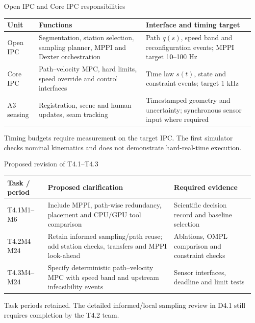 \documentclass[aspectratio=169,10pt]{beamer}
\begin{document}
\begin{frame}{Open IPC and Core IPC responsibilities}
\small\renewcommand{\arraystretch}{1.3}
\begin{tabularx}{\textwidth}{@{}p{}XX@{}}
\toprule
Unit & Functions & Interface and timing target\\\midrule
Open IPC & Segmentation, station selection, sampling planner, MPPI and Dexter orchestration & Path $q(s)$, speed band and reconfiguration events; MPPI target 10--100 Hz\\
Core IPC & Path--velocity MPC, hard limits, speed override and control interfaces & Time law $s(t)$, state and constraint events; target 1 kHz\\
A3 sensing & Registration, scene and human updates, seam tracking & Timestamped geometry and uncertainty; synchronous sensor input where required\\\bottomrule
\end{tabularx}\par\medskip
Timing budgets require measurement on the target IPC. The first simulator checks nominal kinematics and does not demonstrate hard-real-time execution.
\end{frame}

\begin{frame}{Proposed revision of T4.1--T4.3}
\small\renewcommand{\arraystretch}{1.3}
\begin{tabularx}{\textwidth}{@{}p{}XX@{}}
\toprule
Task / period & Proposed clarification & Required evidence\\\midrule
T4.1\newline M1--M6 & Include MPPI, path-wise redundancy, placement and CPU/GPU tool comparison & Scientific decision record and baseline selection\\
T4.2\newline M4--M24 & Retain informed sampling/path reuse; add station checks, transfers and MPPI look-ahead & Ablations, OMPL comparison and constraint checks\\
T4.3\newline M4--M24 & Specify deterministic path--velocity MPC with speed band and upstream infeasibility events & Sensor interfaces, deadline and limit tests\\\bottomrule
\end{tabularx}\par\medskip\small Task periods retained. The detailed informed/local sampling review in D4.1 still requires completion by the T4.2 team.
\end{frame}
\end{document}
